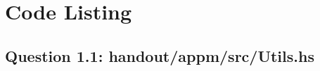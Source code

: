 \documentclass[12pt,a4paper]{article}
\begin{document}






\appendix
\section{Code Listing}
\subsection{Question 1.1: handout/appm/src/Utils.hs}
\label{appendix:question1-1}
\inputminted{haskell}{handout/appm/src/Utils.hs}
\end{document}
